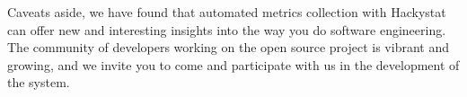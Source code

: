 \documentclass[12pt]{article}
\begin{document}
Caveats aside, we have found that automated metrics collection with
Hackystat can offer new and interesting insights into the way you do
software engineering.  The community of developers working on the open
source project is vibrant and growing, and we invite you to come and
participate with us in the development of the system.
 


\end{document}

